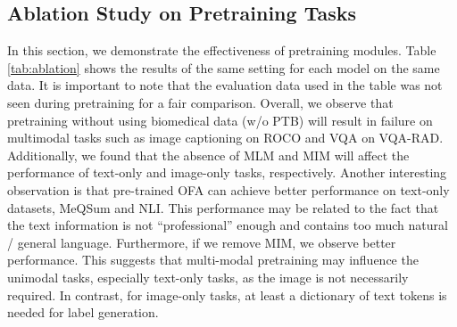 \documentclass[10pt]{article} \usepackage[preprint]{tmlr}
\begin{document}
\subsection{Ablation Study on Pretraining Tasks} \label{sec:ablation_tasks}

In this section, we demonstrate the effectiveness of pretraining modules. Table \ref{tab:ablation} shows the results of the same setting for each model on the same data. It is important to note that the evaluation data used in the table was not seen during pretraining for a fair comparison. Overall, we observe that pretraining without using biomedical data (w/o PTB) will result in failure on multimodal tasks such as image captioning on ROCO and VQA on VQA-RAD. Additionally, we found that the absence of MLM and MIM will affect the performance of text-only and image-only tasks, respectively. Another interesting observation is that pre-trained OFA can achieve better performance on text-only datasets, MeQSum and NLI. This performance may be related to the fact that the text information is not ``professional'' enough and contains too much natural / general language. Furthermore, if we remove MIM, we observe better performance. This suggests that multi-modal pretraining may influence the unimodal tasks, especially text-only tasks, as the image is not necessarily required. In contrast, for image-only tasks, at least a dictionary of text tokens is needed for label generation.

\begin{table}
\centering
\caption{Ablation study on holding out task groups. All the results are obtained from the small-scale model.}
\label{tab:ablation}
\end{table}
\end{document}
